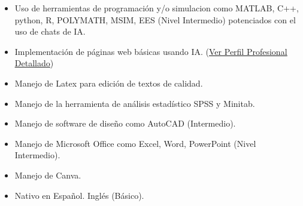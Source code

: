 \documentclass[11pt]{article}
\begin{document}
\begin{itemize}
  \item Uso de herramientas de programación y/o simulacion como MATLAB, C++, python, R, POLYMATH, MSIM, EES (Nivel Intermedio) potenciados con el uso de chats de IA.
  \item Implementación de páginas web básicas usando IA. (\href{https://proyectolaboratorio-cpu.github.io/Pagina_de_Certificados_y_Mas/} {\uline{Ver Perfil Profesional Detallado}})
  \item Manejo de Latex para edición de textos de calidad.
  \item Manejo de la herramienta de análisis estadístico SPSS y Minitab.
  \item Manejo de software de diseño como AutoCAD (Intermedio).
  \item Manejo de Microsoft Office como Excel, Word, PowerPoint (Nivel Intermedio).
  \item Manejo de Canva.
  \item Nativo en Español. Inglés (Básico).
\end{itemize}
\end{document}
